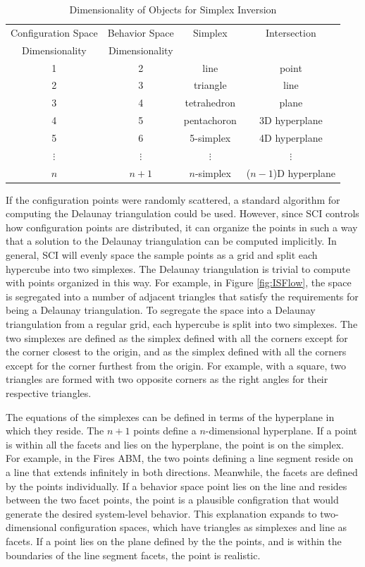 \begin{table}[ht]
  \caption{Dimensionality of Objects for Simplex Inversion}
  \centering
  \begin{tabular}{c c c c}
    \hline \hline
    Configuration Space & Behavior Space & Simplex & Intersection \\
    Dimensionality      & Dimensionality &         &  \\
    \hline
    1 & 2 & line & point \\
    2 & 3 & triangle & line \\
    3 & 4 & tetrahedron & plane \\
    4 & 5 & pentachoron & 3D hyperplane \\
    5 & 6 & 5-simplex & 4D hyperplane \\
    $\vdots$ & $\vdots$ & $\vdots$ & $\vdots$ \\
    $n$ & $n + 1$ & $n$-simplex & ($n-1$)D hyperplane \\
    \hline
  \end{tabular}
  \label{table:dims}
\end{table}

If the configuration points were randomly scattered, a standard algorithm for computing the Delaunay triangulation could be used.
However, since SCI controls how configuration points are distributed, it can organize the points in such a way that a solution to the Delaunay triangulation can be computed implicitly.
In general, SCI will evenly space the sample points as a grid and split each hypercube into two simplexes.
The Delaunay triangulation is trivial to compute with points organized in this way.
For example, in Figure \ref{fig:ISFlow}, the space is segregated into a number of adjacent triangles that satisfy the requirements for being a Delaunay triangulation.
To segregate the space into a Delaunay triangulation from a regular grid, each hypercube is split into two simplexes.
The two simplexes are defined as the simplex defined with all the corners except for the corner closest to the origin, and as the simplex defined with all the corners except for the corner furthest from the origin.
For example, with a square, two triangles are formed with two opposite corners as the right angles for their respective triangles.

The equations of the simplexes can be defined in terms of the hyperplane in which they reside.
The $n+1$ points define a $n$-dimensional hyperplane.
If a point is within all the facets and lies on the hyperplane, the point is on the simplex.
For example, in the Fires ABM, the two points defining a line segment reside on a line that extends infinitely in both directions.
Meanwhile, the facets are defined by the points individually.
If a behavior space point lies on the line and resides between the two facet points, the point is a plausible configration that would generate the desired system-level behavior.
This explanation expands to two-dimensional configuration spaces, which have triangles as simplexes and line as facets.
If a point lies on the plane defined by the the points, and is within the boundaries of the line segment facets, the point is realistic.


